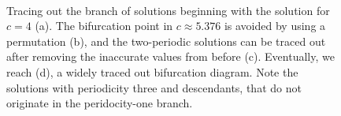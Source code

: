 \begin{figure}[!ht]
	\centering
	\quad
	\\
	\quad
	\caption{Tracing out the branch of solutions beginning with the solution for
	$c=4$ (a). The bifurcation point in $c \approx 5.376$ is avoided by using a permutation (b),
	and the two-periodic solutions can be traced out after removing the inaccurate values
	from before (c). Eventually, we reach (d), a widely traced out bifurcation diagram.
	Note the solutions with periodicity three and descendants, that do not originate in
	the peridocity-one branch.}
	\label{fig:sub1}
\end{figure}

